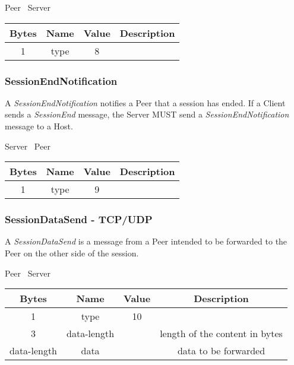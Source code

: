 \documentclass{article}
\begin{document}
    \begin{center}
        Peer \textrightarrow\ Server\\
        \begin{tabular}{|c|c|c|c|}
            \hline
            \textbf{Bytes} & \textbf{Name} & \textbf{Value} & \textbf{Description} \\
            \hline
            1              & type          & 8              &                      \\
            \hline
        \end{tabular}
    \end{center}

    \subsubsection{SessionEndNotification}

    A \emph{SessionEndNotification} notifies a Peer that a session has ended. If a Client sends a \emph{SessionEnd}
    message, the Server MUST send a \emph{SessionEndNotification} message to a Host.

    \begin{center}
        Server \textrightarrow\ Peer\\
        \begin{tabular}{|c|c|c|c|}
            \hline
            \textbf{Bytes} & \textbf{Name} & \textbf{Value} & \textbf{Description} \\
            \hline
            1              & type          & 9              &                      \\
            \hline
        \end{tabular}
    \end{center}

    \subsubsection{SessionDataSend - TCP/UDP}

    A \emph{SessionDataSend} is a message from a Peer intended to be forwarded to the Peer on the other side of the
    session.

    \begin{center}
        Peer \textrightarrow\ Server\\
        \begin{tabular}{|c|c|c|c|}
            \hline
            \textbf{Bytes} & \textbf{Name} & \textbf{Value} & \textbf{Description}           \\
            \hline
            1              & type          & 10             &                                \\
            \hline
            3              & data-length   &                & length of the content in bytes \\
            \hline
            data-length    & data          &                & data to be forwarded           \\
            \hline
        \end{tabular}
    \end{center}
\end{document}
